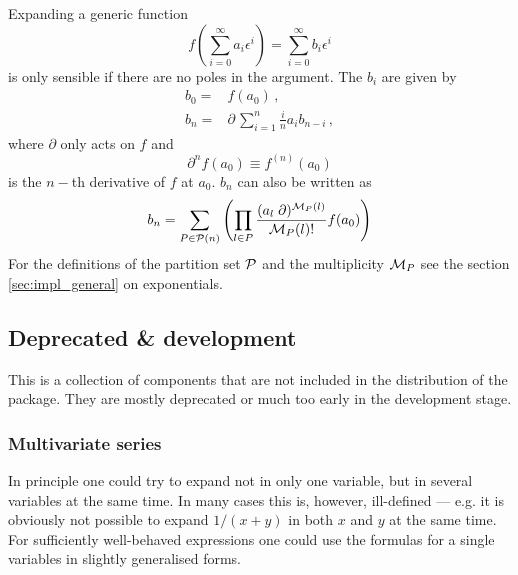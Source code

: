 \documentclass{article}
\begin{document}
Expanding a generic function
\begin{equation}
  \label{eq:generic_fun}
  f\left(\sum_{i=0}^{\infty}a_i
    \epsilon^i\right)=\sum_{i=0}^{\infty}b_i
    \epsilon^i
\end{equation}
is only sensible if there are no poles in the argument.
The $b_i$ are given by
\begin{align}
  \label{eq:generic_rec}
  b_0=&f(a_0)\,,\\
  b_n=&\partial\,\sum_{i=1}^{n}\frac{i}{n} a_{i}b_{n-i} \,,
\end{align}
where $\partial$ only acts on $f$ and
\begin{equation}
  \label{eq:partial}
  \partial^n f(a_0) \equiv f^{(n)}(a_0) 
\end{equation}
is the $n-$th derivative of $f$ at $a_0$. $b_n$ can also be written as
\begin{equation}
  \label{eq:generic_expl}
    b_n=
\sum_{P \in {\cal P}(n)} \left(\prod_{l \in P} \frac{(a_l \;\partial)^{{\cal M}_P(l)}}{{\cal M}_P(l)!} f(a_0)\right)
\end{equation}
For the definitions of the partition set ${\cal P}$ and the
multiplicity ${\cal M}_P$ see the section \ref{sec:impl_general} on
exponentials.

\subsection{Deprecated \& development}
\label{sec:depr}

This is a collection of components that are not included in the
distribution of the package. They are mostly deprecated or much too
early in the development stage.

\subsubsection{Multivariate series}
\label{sec:multi_var}

In principle one could try to expand not in only one variable, but in
several variables at the same time. In many cases this is, however,
ill-defined --- e.g. it is obviously not possible to expand $1/(x+y)$ in
both $x$ and $y$ at the same time. For sufficiently well-behaved
expressions one could use the formulas for a single variables in slightly
generalised forms. 
\end{document}
